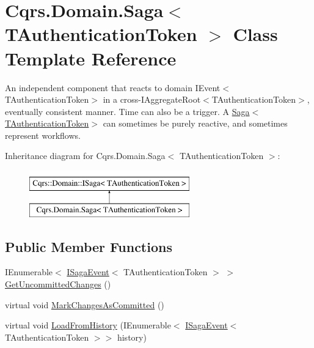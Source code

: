 \hypertarget{classCqrs_1_1Domain_1_1Saga}{}\section{Cqrs.\+Domain.\+Saga$<$ T\+Authentication\+Token $>$ Class Template Reference}
\label{classCqrs_1_1Domain_1_1Saga}


An independent component that reacts to domain I\+Event$<$\+T\+Authentication\+Token$>$ in a cross-\/I\+Aggregate\+Root$<$\+T\+Authentication\+Token$>$, eventually consistent manner. Time can also be a trigger. A \hyperlink{classCqrs_1_1Domain_1_1Saga_a1b6019cecbbf2572b64dd456cb5d91a2}{Saga$<$\+T\+Authentication\+Token$>$} can sometimes be purely reactive, and sometimes represent workflows.  


Inheritance diagram for Cqrs.\+Domain.\+Saga$<$ T\+Authentication\+Token $>$\+:\begin{figure}[H]
\begin{center}
\leavevmode
\includegraphics[height=2.000000cm]{classCqrs_1_1Domain_1_1Saga}
\end{center}
\end{figure}
\subsection*{Public Member Functions}
\begin{DoxyCompactItemize}
\item 
I\+Enumerable$<$ \hyperlink{interfaceCqrs_1_1Events_1_1ISagaEvent}{I\+Saga\+Event}$<$ T\+Authentication\+Token $>$ $>$ \hyperlink{classCqrs_1_1Domain_1_1Saga_a043e8e21e7550c34f5848af7a87e33cd}{Get\+Uncommitted\+Changes} ()
\item 
virtual void \hyperlink{classCqrs_1_1Domain_1_1Saga_a9caac842ea6e88d6e502b63ca1820fe4}{Mark\+Changes\+As\+Committed} ()
\item 
virtual void \hyperlink{classCqrs_1_1Domain_1_1Saga_a6029fc09445e2093f7fb40e304a04ff8}{Load\+From\+History} (I\+Enumerable$<$ \hyperlink{interfaceCqrs_1_1Events_1_1ISagaEvent}{I\+Saga\+Event}$<$ T\+Authentication\+Token $>$$>$ history)
\end{DoxyCompactItemize}
